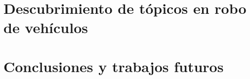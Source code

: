 \documentclass[
	spanish, %
	aspectratio=43, %
	hyperref={pdfencoding=auto,psdextra},
	xcolor={dvipsnames,table,usenames}
]{beamer}
\begin{document}
\section{Descubrimiento de tópicos en robo de vehículos}

\begin{frame}
\frametitle{}
\end{frame}


\begin{frame}
\frametitle{}
\end{frame}


\begin{frame}
\frametitle{}
\end{frame}



\begin{frame}
\frametitle{}
\end{frame}

\begin{frame}
\frametitle{}
\end{frame}

\begin{frame}
\frametitle{}
\end{frame}



\section{Conclusiones y trabajos futuros}

\begin{frame}
\frametitle{}
\end{frame}

\begin{frame}
\frametitle{}
\end{frame}



\begin{frame}[allowframebreaks]\normalsize
	\frametitle{\namereferences}
	
\end{frame}
\end{document}
